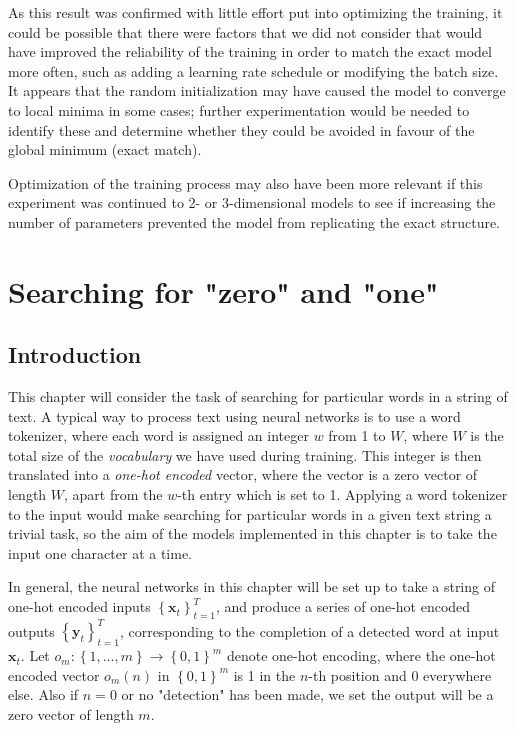 \documentclass{somasmsc}
\begin{document}
As this result was confirmed with little effort put into optimizing the training, it could be possible that there were factors that we did not consider that would have improved the reliability of the training in order to match the exact model more often, such as adding a learning rate schedule or modifying the batch size. It appears that the random initialization may have caused the model to converge to local minima in some cases; further experimentation would be needed to identify these and determine whether they could be avoided in favour of the global minimum (exact match).

Optimization of the training process may also have been more relevant if this experiment was continued to 2- or 3-dimensional models to see if increasing the number of parameters prevented the model from replicating the exact structure.

\chapter{Searching for "zero" and "one"}

\section{Introduction}

This chapter will consider the task of searching for particular words in a string of text. A typical way to process text using neural networks is to use a word tokenizer, where each word is assigned an integer $w$ from 1 to $W$, where $W$ is the total size of the \textit{vocabulary} we have used during training. This integer is then translated into a \textit{one-hot encoded} vector, where the vector is a zero vector of length $W$, apart from the $w$-th entry which is set to 1. Applying a word tokenizer to the input would make searching for particular words in a given text string a trivial task, so the aim of the models implemented in this chapter is to take the input one character at a time.

In general, the neural networks in this chapter will be set up to take a string of one-hot encoded inputs $\left\{\pmb{x}_t\right\}_{t=1}^T$, and produce a series of one-hot encoded outputs $\left\{\pmb{y}_t\right\}_{t=1}^T$, corresponding to the completion of a detected word at input $\pmb{x}_t$. Let $o_m: \left\{1, \dots, m\right\} \rightarrow \left\{0, 1\right\}^m$ denote one-hot encoding, where the one-hot encoded vector $o_m(n)$ in $\left\{0,1\right\}^m$ is 1 in the $n$-th position and 0 everywhere else. Also if $n=0$ or no "detection" has been made, we set the output will be a zero vector of length $m$.
\end{document}
